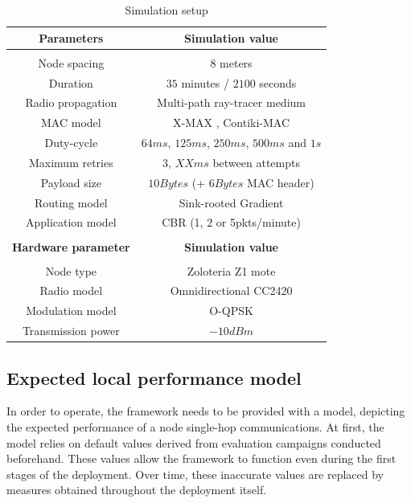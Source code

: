 \documentclass[12pt,journal,compsoc]{IEEEtran}
\begin{document}
\begin{table}[htb]
	\begin{tabular}{c | c}
	\\
	\textbf{Parameters} & \textbf{Simulation value} \\
	\hline\hline \\
	Node spacing & $8$ meters \\
	Duration & $35$ minutes / $2100$ seconds \\
	Radio propagation & Multi-path ray-tracer medium\\
	MAC model & X-MAX \cite{bya06xmac}, Contiki-MAC \cite{?}\\
	Duty-cycle & $64ms$, $125ms$, $250ms$, $500ms$ and $1s$\\
	Maximum retries & $3$, $XXms$ between attempts\\
	Payload size & $10Bytes$ (+ $6Bytes$ MAC header)\\
	Routing model & Sink-rooted Gradient\\
	Application model & CBR (1, 2 or 5pkts/minute)\\
	\hline \\
	\textbf{Hardware parameter} & \textbf{Simulation value} \\
	\hline \hline \\
	Node type & Zoloteria Z1 mote\\
	Radio model & Omnidirectional CC2420\\
	Modulation model & O-QPSK\\
	Transmission power & $-10dBm$\\
	\hline
	\end{tabular}
	\vspace{0.5cm}
	\caption{Simulation setup}
	\label{tableSetup}
\end{table}


\subsection{Expected local performance model}

In order to operate, the framework needs to be provided with a model, depicting the expected performance of a node single-hop communications. At first, the model relies on default values derived from evaluation campaigns conducted beforehand. These values allow the framework to function even during the first stages of the deployment. Over time, these inaccurate values are replaced by measures obtained throughout the deployment itself.
\end{document}
